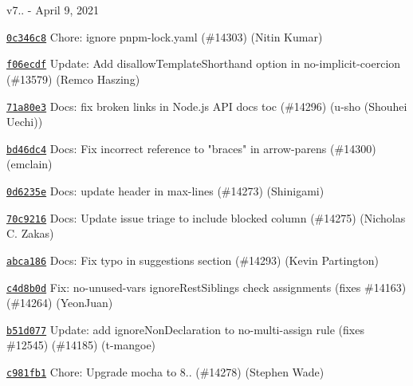 v7.. -\/ April 9, 2021


\begin{DoxyItemize}
\item \href{https://github.com/eslint/eslint/commit/0c346c87fa83c6d1184fdafb9c0748c2e15a423d}{\texttt{ {\ttfamily 0c346c8}}} Chore\+: ignore {\ttfamily pnpm-\/lock.\+yaml} (\#14303) (Nitin Kumar)
\item \href{https://github.com/eslint/eslint/commit/f06ecdf78b6d6f366434d73a6acfe7041d575223}{\texttt{ {\ttfamily f06ecdf}}} Update\+: Add disallow\+Template\+Shorthand option in no-\/implicit-\/coercion (\#13579) (Remco Haszing)
\item \href{https://github.com/eslint/eslint/commit/71a80e38aab2dada01b808ed43d9b0e806d863c4}{\texttt{ {\ttfamily 71a80e3}}} Docs\+: fix broken links in Node.\+js API docs toc (\#14296) (u-\/sho (Shouhei Uechi))
\item \href{https://github.com/eslint/eslint/commit/bd46dc4647faa4c3bbb5f60d4c00616a64081398}{\texttt{ {\ttfamily bd46dc4}}} Docs\+: Fix incorrect reference to "{}braces"{} in arrow-\/parens (\#14300) (emclain)
\item \href{https://github.com/eslint/eslint/commit/0d6235ea201b8b90761ee69bb4d46ae18899c28d}{\texttt{ {\ttfamily 0d6235e}}} Docs\+: update header in max-\/lines (\#14273) (Shinigami)
\item \href{https://github.com/eslint/eslint/commit/70c92164017238e329e3a2d1654a0227b8f953f7}{\texttt{ {\ttfamily 70c9216}}} Docs\+: Update issue triage to include blocked column (\#14275) (Nicholas C. Zakas)
\item \href{https://github.com/eslint/eslint/commit/abca186a845200fd7728c4e5f220973e640054f9}{\texttt{ {\ttfamily abca186}}} Docs\+: Fix typo in suggestions section (\#14293) (Kevin Partington)
\item \href{https://github.com/eslint/eslint/commit/c4d8b0db62b859e721105d4bc0f4044ce346995e}{\texttt{ {\ttfamily c4d8b0d}}} Fix\+: no-\/unused-\/vars ignore\+Rest\+Siblings check assignments (fixes \#14163) (\#14264) (Yeon\+Juan)
\item \href{https://github.com/eslint/eslint/commit/b51d0778d76c2aa27578caca3ea82c867dced3e4}{\texttt{ {\ttfamily b51d077}}} Update\+: add ignore\+Non\+Declaration to no-\/multi-\/assign rule (fixes \#12545) (\#14185) (t-\/mangoe)
\item \href{https://github.com/eslint/eslint/commit/c981fb1994cd04914042ced1980aa86b68ba7be9}{\texttt{ {\ttfamily c981fb1}}} Chore\+: Upgrade mocha to 8.. (\#14278) (Stephen Wade)

\end{DoxyItemize}
